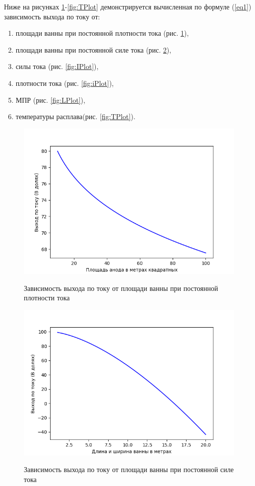 \documentclass{article}
\begin{document}
Ниже на рисунках \ref{fig:SPlot}-\ref{fig:TPlot} демонстрируется вычисленная по формуле (\ref{eq1}) зависимость выхода по току от:
\begin{enumerate}
\item площади ванны при постоянной плотности тока (рис. \ref{fig:SPlot}),
\item площади ванны при постоянной силе тока (рис. \ref{fig:SaPlot}),
\item силы тока (рис. \ref{fig:IPlot}),
\item плотности тока (рис. \ref{fig:iPlot}),
\item МПР (рис. \ref{fig:LPlot}),
\item температуры расплава(рис. \ref{fig:TPlot}).
\end{enumerate}
\begin{figure}[H]
\centering
\includegraphics[width=0.8\linewidth]{S.png}
\caption{}
\label{fig:SPlot}
Зависимость выхода по току от площади ванны при постоянной плотности тока
\end{figure}

\begin{figure}[H]
\centering
\includegraphics[width=0.8\linewidth]{Sa.png}
\caption{}
\label{fig:SaPlot}
Зависимость выхода по току от площади ванны при постоянной силе тока
\end{figure}
\end{document}
